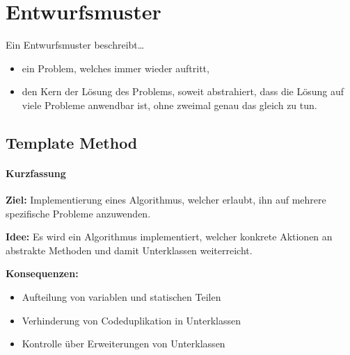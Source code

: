 	\section{Entwurfsmuster}
		Ein Entwurfsmuster beschreibt\dots
		\begin{itemize}
			\item ein Problem, welches immer wieder auftritt,
			\item den Kern der Lösung des Problems, soweit abstrahiert, dass die Lösung auf viele Probleme anwendbar ist, ohne zweimal genau das gleich zu tun.
		\end{itemize}

		\subsection{Template Method}
			\paragraph{Kurzfassung}
				\textbf{Ziel:} Implementierung eines Algorithmus, welcher erlaubt, ihn auf mehrere spezifische Probleme anzuwenden.
				
				\textbf{Idee:} Es wird ein Algorithmus implementiert, welcher konkrete Aktionen an abstrakte Methoden und damit Unterklassen weiterreicht.
				
				\textbf{Konsequenzen:}
					\begin{itemize}
						\item Aufteilung von variablen und statischen Teilen
						\item Verhinderung von Codeduplikation in Unterklassen
						\item Kontrolle über Erweiterungen von Unterklassen
					\end{itemize}
			
